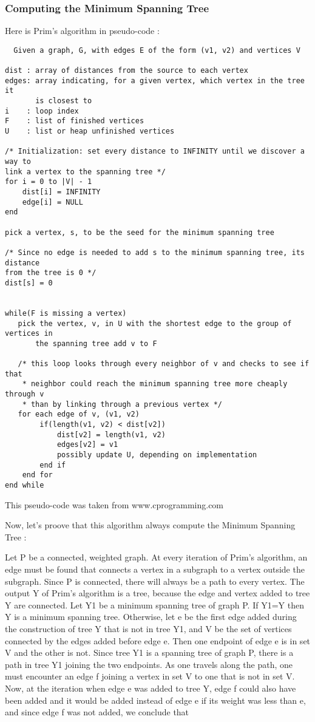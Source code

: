 \documentclass[11pt]{article}
\begin{document}
\subsubsection{Computing the Minimum Spanning Tree}

Here is Prim's algorithm in pseudo-code :

\begin{lstlisting}
  Given a graph, G, with edges E of the form (v1, v2) and vertices V

dist : array of distances from the source to each vertex
edges: array indicating, for a given vertex, which vertex in the tree it 
       is closest to
i    : loop index
F    : list of finished vertices
U    : list or heap unfinished vertices

/* Initialization: set every distance to INFINITY until we discover a way to
link a vertex to the spanning tree */
for i = 0 to |V| - 1
    dist[i] = INFINITY
    edge[i] = NULL
end

pick a vertex, s, to be the seed for the minimum spanning tree

/* Since no edge is needed to add s to the minimum spanning tree, its distance
from the tree is 0 */
dist[s] = 0


while(F is missing a vertex)
   pick the vertex, v, in U with the shortest edge to the group of vertices in
       the spanning tree add v to F

   /* this loop looks through every neighbor of v and checks to see if that
    * neighbor could reach the minimum spanning tree more cheaply through v
    * than by linking through a previous vertex */
   for each edge of v, (v1, v2)
        if(length(v1, v2) < dist[v2])
            dist[v2] = length(v1, v2)
            edges[v2] = v1
            possibly update U, depending on implementation
        end if
    end for
end while

\end{lstlisting}
This pseudo-code was taken from www.cprogramming.com

Now, let's proove that this algorithm always compute the Minimum Spanning Tree :


Let P be a connected, weighted graph. At every iteration of Prim's algorithm, an edge must be found that connects a vertex in a subgraph to a vertex outside the subgraph. Since P is connected, there will always be a path to every vertex. The output Y of Prim's algorithm is a tree, because the edge and vertex added to tree Y are connected. Let Y1 be a minimum spanning tree of graph P. If Y1=Y then Y is a minimum spanning tree. Otherwise, let e be the first edge added during the construction of tree Y that is not in tree Y1, and V be the set of vertices connected by the edges added before edge e. Then one endpoint of edge e is in set V and the other is not. Since tree Y1 is a spanning tree of graph P, there is a path in tree Y1 joining the two endpoints. As one travels along the path, one must encounter an edge f joining a vertex in set V to one that is not in set V. Now, at the iteration when edge e was added to tree Y, edge f could also have been added and it would be added instead of edge e if its weight was less than e, and since edge f was not added, we conclude that
\end{document}
